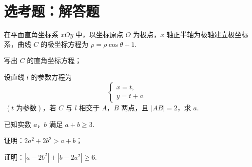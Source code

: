 \documentclass[UTF8,12pt]{ctexart}
\begin{document}
\section*{选考题：解答题}

\begin{questions}[start=22]

  \item 在平面直角坐标系 $xOy$ 中，以坐标原点 $O$ 为极点，$x$
    轴正半轴为极轴建立极坐标系，曲线 $C$ 的极坐标方程为 $\rho=\rho\cos\theta+1$.

    \begin{subquestions}
      \item
      写出 $C$ 的直角坐标方程；
      \item
      设直线 $l$ 的参数方程为 \[\begin{cases}x=t, \\y=t+a\end{cases}\]
        $\ (t\text{ 为参数})$，若 $C$ 与 $l$ 相交于 $A$，$B$ 两点，且 $|AB|=2$，求 $a$.
    \end{subquestions}

  \item 已知实数 $a$，$b$ 满足 $a+b\ge3$.

    \begin{subquestions}
      \item
      证明：$2a^2+2b^2>a+b$；
      \item
      证明：$|a-2b^2|+|b-2a^2|\ge6$.
    \end{subquestions}

\end{questions}
\end{document}
